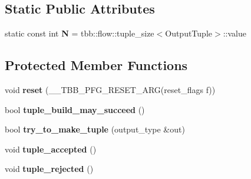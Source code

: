 \subsection*{Static Public Attributes}
\begin{DoxyCompactItemize}
\item 
\hypertarget{classinternal_1_1join__node__FE_3_01reserving_00_01InputTuple_00_01OutputTuple_01_4_aac5ea423465ec7366218f408b67c2415}{}static const int {\bfseries N} = tbb\+::flow\+::tuple\+\_\+size$<$Output\+Tuple$>$\+::value\label{classinternal_1_1join__node__FE_3_01reserving_00_01InputTuple_00_01OutputTuple_01_4_aac5ea423465ec7366218f408b67c2415}

\end{DoxyCompactItemize}
\subsection*{Protected Member Functions}
\begin{DoxyCompactItemize}
\item 
\hypertarget{classinternal_1_1join__node__FE_3_01reserving_00_01InputTuple_00_01OutputTuple_01_4_a4d8fb665fb0811897b02830f99b9f452}{}void {\bfseries reset} (\+\_\+\+\_\+\+T\+B\+B\+\_\+\+P\+F\+G\+\_\+\+R\+E\+S\+E\+T\+\_\+\+A\+R\+G(reset\+\_\+flags f))\label{classinternal_1_1join__node__FE_3_01reserving_00_01InputTuple_00_01OutputTuple_01_4_a4d8fb665fb0811897b02830f99b9f452}

\item 
\hypertarget{classinternal_1_1join__node__FE_3_01reserving_00_01InputTuple_00_01OutputTuple_01_4_a49bb57e9ef0110154ea3f5e400a81ac1}{}bool {\bfseries tuple\+\_\+build\+\_\+may\+\_\+succeed} ()\label{classinternal_1_1join__node__FE_3_01reserving_00_01InputTuple_00_01OutputTuple_01_4_a49bb57e9ef0110154ea3f5e400a81ac1}

\item 
\hypertarget{classinternal_1_1join__node__FE_3_01reserving_00_01InputTuple_00_01OutputTuple_01_4_af779c824efe851a892d60dbf3a41035d}{}bool {\bfseries try\+\_\+to\+\_\+make\+\_\+tuple} (output\+\_\+type \&out)\label{classinternal_1_1join__node__FE_3_01reserving_00_01InputTuple_00_01OutputTuple_01_4_af779c824efe851a892d60dbf3a41035d}

\item 
\hypertarget{classinternal_1_1join__node__FE_3_01reserving_00_01InputTuple_00_01OutputTuple_01_4_a328c2a2824ec8f1b70711067a519468d}{}void {\bfseries tuple\+\_\+accepted} ()\label{classinternal_1_1join__node__FE_3_01reserving_00_01InputTuple_00_01OutputTuple_01_4_a328c2a2824ec8f1b70711067a519468d}

\item 
\hypertarget{classinternal_1_1join__node__FE_3_01reserving_00_01InputTuple_00_01OutputTuple_01_4_a7097ed97b00d75437eab632e2d91d830}{}void {\bfseries tuple\+\_\+rejected} ()\label{classinternal_1_1join__node__FE_3_01reserving_00_01InputTuple_00_01OutputTuple_01_4_a7097ed97b00d75437eab632e2d91d830}

\end{DoxyCompactItemize}

